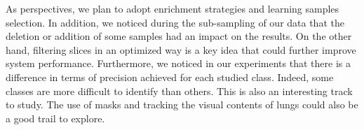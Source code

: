 \documentclass{llncs}
\begin{document}
As perspectives, we plan to adopt enrichment strategies and learning samples selection. In addition, we noticed during the sub-sampling of our data that the deletion or addition of some samples had an impact on the results. On the other hand, filtering slices in an optimized way is a key idea that could further improve system performance. Furthermore, we noticed in our experiments that there is a difference in terms of precision achieved for each studied class. Indeed, some classes are more difficult to identify than others. This is also an interesting track to study. The use of masks and tracking the visual contents of lungs could also be a good trail to explore.


\end{document}
